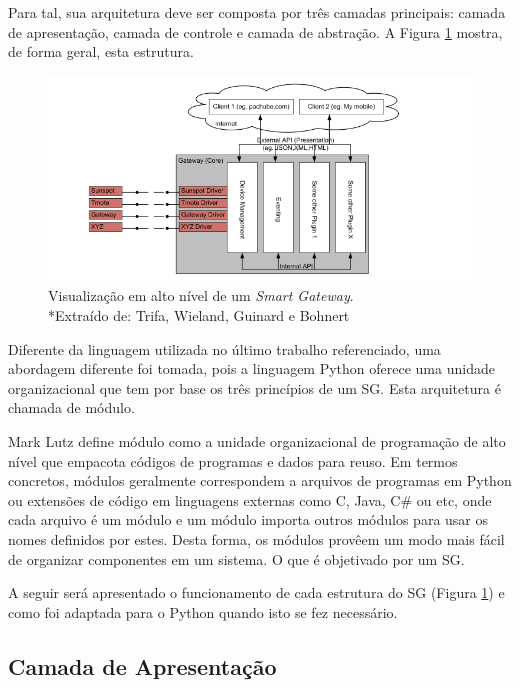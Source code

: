 \documentclass[12pt,a4paper,oneside]{report}
\begin{document}
Para tal, sua arquitetura deve ser composta por três camadas principais: camada de apresentação, camada de controle e camada de abstração. A Figura \ref{fig:estrutura-sg} mostra, de forma geral, esta estrutura.

\begin{figure}[htbp]
   \centering
    \includegraphics[width=1\textwidth]{figuras/figura_2_8}
	\caption{Visualização em alto nível de um \emph{Smart Gateway}. \\ *\footnotesize Extraído de: Trifa, Wieland, Guinard e Bohnert \cite{sgtriwiguiboh}}
    \label{fig:estrutura-sg}
\end{figure}

Diferente da linguagem utilizada no último trabalho referenciado, uma abordagem diferente foi tomada, pois a linguagem Python oferece uma unidade organizacional que tem por base os três princípios de um SG. Esta arquitetura é chamada de módulo.

Mark Lutz \cite{python} define módulo como a unidade organizacional de programação de alto nível que empacota códigos de programas e dados para reuso. Em termos concretos, módulos geralmente correspondem a arquivos de programas em Python ou extensões de código em linguagens externas como C, Java, C\# ou etc, onde cada arquivo é um módulo e um módulo importa outros módulos para usar os nomes definidos por estes. Desta forma, os módulos provêem um modo mais fácil de organizar componentes em um sistema. O que é objetivado por um SG.

A seguir será apresentado o funcionamento de cada estrutura do SG (Figura \ref{fig:estrutura-sg}) e como foi adaptada para o Python quando isto se fez necessário.

\subsection{Camada de Apresentação}
\end{document}
